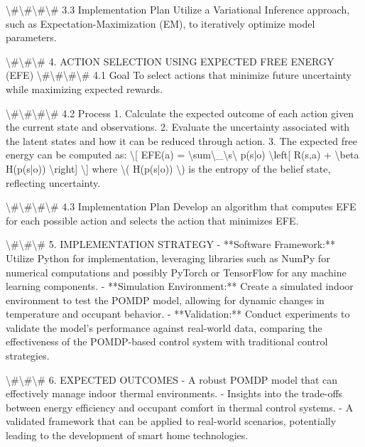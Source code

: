 \documentclass[11pt,a4paper]{article}
\begin{document}
\textbackslash{}#\textbackslash{}#\textbackslash{}#\textbackslash{}# 3.3 Implementation Plan
Utilize a Variational Inference approach, such as Expectation-Maximization (EM), to iteratively optimize model parameters.

\textbackslash{}#\textbackslash{}#\textbackslash{}# 4. ACTION SELECTION USING EXPECTED FREE ENERGY (EFE)
\textbackslash{}#\textbackslash{}#\textbackslash{}#\textbackslash{}# 4.1 Goal
To select actions that minimize future uncertainty while maximizing expected rewards.

\textbackslash{}#\textbackslash{}#\textbackslash{}#\textbackslash{}# 4.2 Process
1. Calculate the expected outcome of each action given the current state and observations.
2. Evaluate the uncertainty associated with the latent states and how it can be reduced through action.
3. The expected free energy can be computed as:
\textbackslash{}[
EFE(a) = \textbackslash{}sum\textbackslash{}_\textbackslash{}{s\textbackslash{}} p(s|o) \textbackslash{}left[ R(s,a) + \textbackslash{}beta H(p(s|o)) \textbackslash{}right]
\textbackslash{}]
where \textbackslash{}( H(p(s|o)) \textbackslash{}) is the entropy of the belief state, reflecting uncertainty.

\textbackslash{}#\textbackslash{}#\textbackslash{}#\textbackslash{}# 4.3 Implementation Plan
Develop an algorithm that computes EFE for each possible action and selects the action that minimizes EFE.

\textbackslash{}#\textbackslash{}#\textbackslash{}# 5. IMPLEMENTATION STRATEGY
- **Software Framework:** Utilize Python for implementation, leveraging libraries such as NumPy for numerical computations and possibly PyTorch or TensorFlow for any machine learning components.
- **Simulation Environment:** Create a simulated indoor environment to test the POMDP model, allowing for dynamic changes in temperature and occupant behavior.
- **Validation:** Conduct experiments to validate the model's performance against real-world data, comparing the effectiveness of the POMDP-based control system with traditional control strategies.

\textbackslash{}#\textbackslash{}#\textbackslash{}# 6. EXPECTED OUTCOMES
- A robust POMDP model that can effectively manage indoor thermal environments.
- Insights into the trade-offs between energy efficiency and occupant comfort in thermal control systems.
- A validated framework that can be applied to real-world scenarios, potentially leading to the development of smart home technologies.
\end{document}
